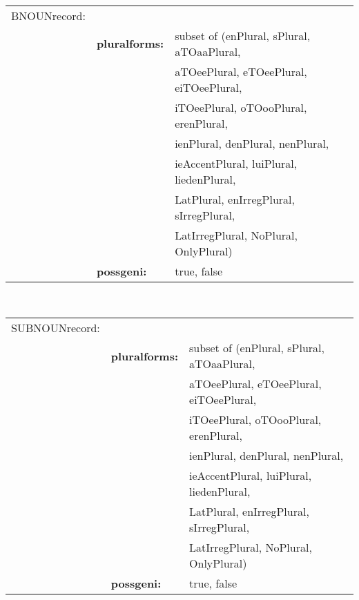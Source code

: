 \\
\begin{tabular}{lll}
BNOUNrecord: &                 &              \\
             & {\bf pluralforms:} & subset of (enPlural, sPlural, aTOaaPlural, \\
             &                 & aTOeePlural, eTOeePlural, eiTOeePlural,    \\
             &                 & iTOeePlural, oTOooPlural, erenPlural,      \\
             &                 & ienPlural, denPlural, nenPlural,           \\
             &                 & ieAccentPlural, luiPlural, liedenPlural,   \\
             &                 & LatPlural, enIrregPlural, sIrregPlural,    \\
             &                 & LatIrregPlural, NoPlural, OnlyPlural)      \\
             & {\bf possgeni:} & true, false                          \\
\end{tabular}
\\
\begin{tabular}{lll}
SUBNOUNrecord: &               &              \\
             & {\bf pluralforms:} & subset of (enPlural, sPlural, aTOaaPlural,  \\
             &                 & aTOeePlural, eTOeePlural, eiTOeePlural,    \\
             &                 & iTOeePlural, oTOooPlural, erenPlural,      \\
             &                 & ienPlural, denPlural, nenPlural,           \\
             &                 & ieAccentPlural, luiPlural, liedenPlural,   \\
             &                 & LatPlural, enIrregPlural, sIrregPlural,    \\
             &                 & LatIrregPlural, NoPlural, OnlyPlural)      \\  
             & {\bf possgeni:} & true, false                          \\
\end{tabular}
\\
